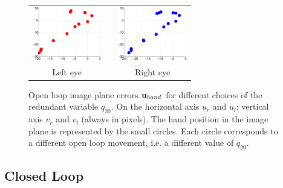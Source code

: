 \begin{figure}
  \begin{center}
	\begin{tabular}{ccc}
	  \parbox{30mm}{\includegraphics[width=30mm]{Figure/LeftEyeOpenLoop.eps}}  & \hspace{0.1cm} &
	  \parbox{30mm}{\includegraphics[width=30mm]{Figure/RightEyeOpenLoop.eps}}
	  \\
	  \parbox{30mm}{\centering Left eye } & \hspace{0.1cm} & \parbox{30mm}{\centering Right eye }
  \end{tabular}
\end{center}
\caption{Open loop image plane errors $\mathbf{u}_{hand}$ for different
choices of the redundant variable $q_{20}$. On the horizontal axis 
$u_r$ and $u_l$; vertical axis $v_r$ and $v_l$ (always in pixels).
The hand position in the image plane is represented 
by the small circles.  Each circle corresponds to a different open loop movement, i.e. a different value of $q_{20}$.
}\label{Fig:ImagePlaneOpenLoopErrors}
 \end{figure}

\subsection{Closed Loop}

